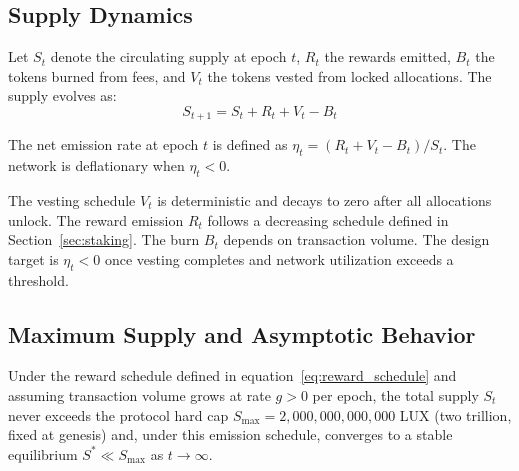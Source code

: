 \subsection{Supply Dynamics}

Let $S_t$ denote the circulating supply at epoch $t$, $R_t$ the rewards emitted, $B_t$ the tokens burned from fees, and $V_t$ the tokens vested from locked allocations. The supply evolves as:
\begin{equation}\label{eq:supply}
    S_{t+1} = S_t + R_t + V_t - B_t
\end{equation}

\begin{definition}
The net emission rate at epoch $t$ is defined as $\eta_t = (R_t + V_t - B_t) / S_t$. The network is deflationary when $\eta_t < 0$.
\end{definition}

The vesting schedule $V_t$ is deterministic and decays to zero after all allocations unlock. The reward emission $R_t$ follows a decreasing schedule defined in Section~\ref{sec:staking}. The burn $B_t$ depends on transaction volume. The design target is $\eta_t < 0$ once vesting completes and network utilization exceeds a threshold.

\subsection{Maximum Supply and Asymptotic Behavior}

\begin{theorem}\label{thm:bounded}
Under the reward schedule defined in equation~\eqref{eq:reward_schedule} and assuming transaction volume grows at rate $g > 0$ per epoch, the total supply $S_t$ never exceeds the protocol hard cap $S_{\max} = 2{,}000{,}000{,}000{,}000$ LUX (two trillion, fixed at genesis) and, under this emission schedule, converges to a stable equilibrium $S^* \ll S_{\max}$ as $t \to \infty$.
\end{theorem}

